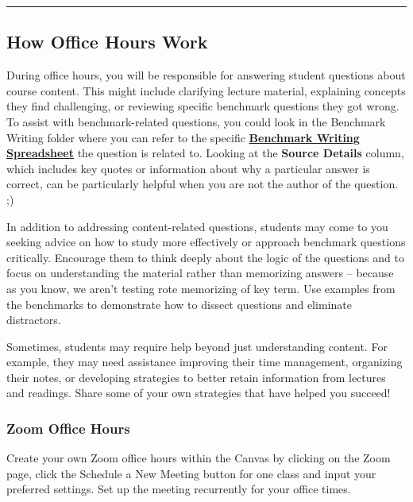\documentclass[
]{article}
\begin{document}
\begin{center}\rule{0.5\linewidth}{0.5pt}\end{center}

\hypertarget{how-office-hours-work}{%
\subsection{How Office Hours Work}\label{how-office-hours-work}}

During office hours, you will be responsible for answering student questions about course content. This might include clarifying lecture material, explaining concepts they find challenging, or reviewing specific benchmark questions they got wrong. To assist with benchmark-related questions, you could look in the Benchmark Writing folder where you can refer to the specific \href{https://drive.google.com/drive/folders/1TBohqmI-Khge4n4NfeWAjVi5rFwVx2D6?usp=drive_link}{\textbf{Benchmark Writing Spreadsheet}} the question is related to. Looking at the \textbf{Source Details} column, which includes key quotes or information about why a particular answer is correct, can be particularly helpful when you are not the author of the question. ;)

In addition to addressing content-related questions, students may come to you seeking advice on how to study more effectively or approach benchmark questions critically. Encourage them to think deeply about the logic of the questions and to focus on understanding the material rather than memorizing answers -- because as you know, we aren't testing rote memorizing of key term. Use examples from the benchmarks to demonstrate how to dissect questions and eliminate distractors.

Sometimes, students may require help beyond just understanding content. For example, they may need assistance improving their time management, organizing their notes, or developing strategies to better retain information from lectures and readings. Share some of your own strategies that have helped you succeed!

\hypertarget{zoom-office-hours}{%
\subsubsection{Zoom Office Hours}\label{zoom-office-hours}}

Create your own Zoom office hours within the Canvas by clicking on the Zoom page, click the Schedule a New Meeting button for one class and input your preferred settings. Set up the meeting recurrently for your office times.
\end{document}
